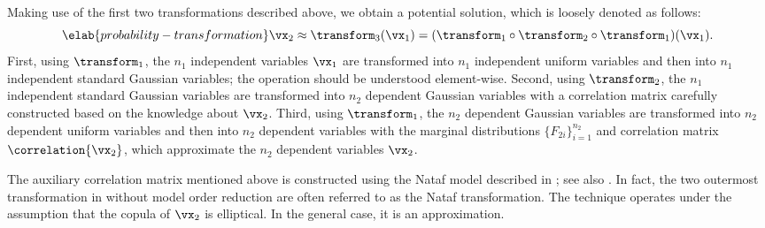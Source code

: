 Making use of the first two transformations described above, we obtain a
potential solution, which is loosely denoted as follows:
\begin{equation} \elab{probability-transformation}
  \vx_2 \approx \transform_3(\vx_1) = (\transform_1 \circ \transform_2 \circ \transform_1)(\vx_1).
\end{equation}
First, using $\transform_1$, the $n_1$ independent variables $\vx_1$ are
transformed into $n_1$ independent uniform variables and then into $n_1$
independent standard Gaussian variables; the operation should be understood
element-wise. Second, using $\transform_2$, the $n_1$ independent standard
Gaussian variables are transformed into $n_2$ dependent Gaussian variables with
a correlation matrix carefully constructed based on the knowledge about $\vx_2$.
Third, using $\transform_1$, the $n_2$ dependent Gaussian variables are
transformed into $n_2$ dependent uniform variables and then into $n_2$ dependent
variables with the marginal distributions $\{ F_{2i} \}_{i = 1}^{n_2}$ and
correlation matrix $\correlation{\vx_2}$, which approximate the $n_2$ dependent
variables $\vx_2$.

The auxiliary correlation matrix mentioned above is constructed using the Nataf
model described in \cite{liu1986}; see also \cite{li2008}. In fact, the two
outermost transformation in  without model
order reduction are often referred to as the Nataf transformation. The technique
operates under the assumption that the copula of $\vx_2$ is elliptical. In the
general case, it is an approximation.
